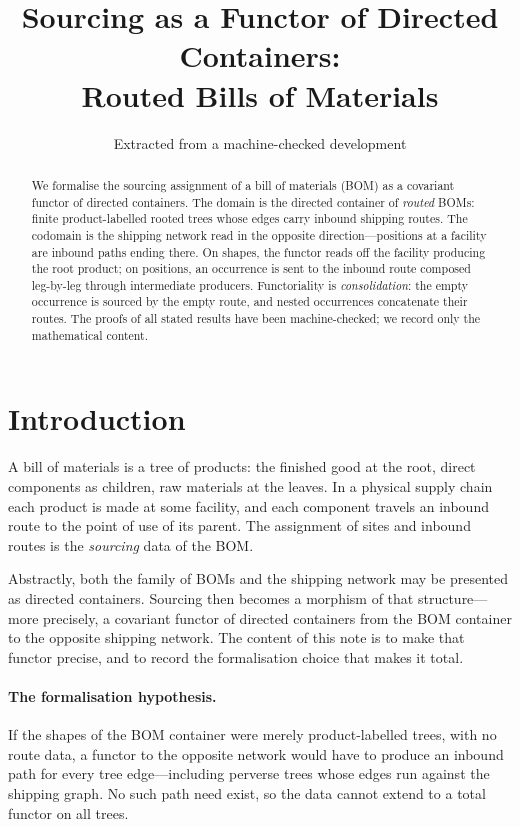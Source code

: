 \documentclass[11pt,a4paper]{article}
\title{Sourcing as a Functor of Directed Containers:\\
  Routed Bills of Materials}
\author{Extracted from a machine-checked development}
\date{}
\theoremstyle{plain}
\theoremstyle{definition}
\begin{document}
\maketitle

\begin{abstract}
We formalise the sourcing assignment of a bill of materials (BOM) as a
covariant functor of directed containers. The domain is the directed
container of \emph{routed} BOMs: finite product-labelled rooted trees whose
edges carry inbound shipping routes. The codomain is the shipping network
read in the opposite direction---positions at a facility are inbound paths
ending there. On shapes, the functor reads off the facility producing the
root product; on positions, an occurrence is sent to the inbound route
composed leg-by-leg through intermediate producers. Functoriality is
\emph{consolidation}: the empty occurrence is sourced by the empty route,
and nested occurrences concatenate their routes. The proofs of all stated
results have been machine-checked; we record only the mathematical content.
\end{abstract}

\tableofcontents
\bigskip

\section{Introduction}

A bill of materials is a tree of products: the finished good at the root,
direct components as children, raw materials at the leaves. In a physical
supply chain each product is made at some facility, and each component
travels an inbound route to the point of use of its parent. The assignment
of sites and inbound routes is the \emph{sourcing} data of the BOM.

Abstractly, both the family of BOMs and the shipping network may be
presented as directed containers. Sourcing then becomes a morphism of that
structure---more precisely, a covariant functor of directed containers
from the BOM container to the opposite shipping network. The content of
this note is to make that functor precise, and to record the
formalisation choice that makes it total.

\paragraph{The formalisation hypothesis.}
If the shapes of the BOM container were merely product-labelled trees,
with no route data, a functor to the opposite network would have to
produce an inbound path for every tree edge---including perverse trees
whose edges run against the shipping graph. No such path need exist, so
the data cannot extend to a total functor on all trees.
\end{document}
